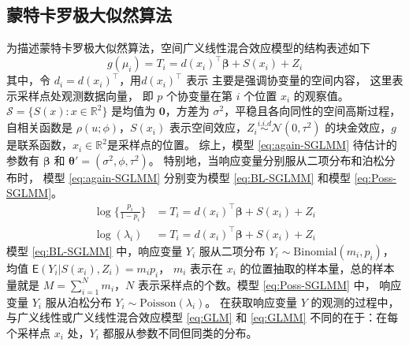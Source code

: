 \documentclass[12pt,a4paper,UTF8,twoside]{book}
\theoremstyle{definition}
\theoremstyle{definition}
\theoremstyle{definition}
\theoremstyle{remark}
\begin{document}
\hypertarget{subsec:MCML}{%
\subsection{蒙特卡罗极大似然算法}\label{subsec:MCML}}

为描述蒙特卡罗极大似然算法，空间广义线性混合效应模型的结构表述如下
\begin{equation}
g(\mu_i) = T_{i} = d(x_i)^{\top}\boldsymbol{\beta} + S(x_i) + Z_i \label{eq:again-SGLMM}
\end{equation} \noindent 其中，令
\(d_{i} = d(x_i)^{\top}\)，用\(d(x_i)^{\top}\) 表示
主要是强调协变量的空间内容， 这里表示采样点处观测数据向量， 即 \(p\)
个协变量在第 \(i\) 个位置 \(x_i\) 的观察值。
\(\mathcal{S} = \{S(x): x \in \mathbb{R}^2\}\) 是均值为
\(\mathbf{0}\)，方差为
\(\sigma^2\)，平稳且各向同性的空间高斯过程，自相关函数是
\(\rho(u;\phi)\)，\(S(x_i)\)
表示空间效应，\(Z_i \stackrel{i.i.d}{\sim} \mathcal{N}(0,\tau^2)\)
的块金效应，\(g\) 是联系函数，\(x_i \in \mathbb{R}^2\)是采样点的位置。
综上，模型 \eqref{eq:again-SGLMM} 待估计的参数有 \(\boldsymbol{\beta}\) 和
\(\boldsymbol{\theta}' = (\sigma^2,\phi,\tau^2)\)。
特别地，当响应变量分别服从二项分布和泊松分布时， 模型
\eqref{eq:again-SGLMM} 分别变为模型 \eqref{eq:BL-SGLMM} 和模型
\eqref{eq:Poss-SGLMM}。 \begin{align}
\log\{\frac{p_i}{1-p_i}\} & = T_{i} = d(x_i)^{\top}\boldsymbol{\beta} + S(x_i) + Z_i  \label{eq:BL-SGLMM}\\
\log(\lambda_i)           & = T_{i} = d(x_i)^{\top}\boldsymbol{\beta} + S(x_i) + Z_i  \label{eq:Poss-SGLMM}
\end{align} \noindent 模型 \eqref{eq:BL-SGLMM} 中，响应变量 \(Y_i\)
服从二项分布 \(Y_i \sim \mathrm{Binomial}(m_i,p_i)\)， 均值
\(\mathsf{E}(Y_i|S(x_i),Z_i)=m_{i}p_{i}\)， \(m_i\) 表示在 \(x_i\)
的位置抽取的样本量，总的样本量就是 \(M = \sum_{i=1}^{N}m_i\)，\(N\)
表示采样点的个数。模型 \eqref{eq:Poss-SGLMM} 中， 响应变量 \(Y_i\)
服从泊松分布 \(Y_i \sim \mathrm{Poisson}(\lambda_i)\)。 在获取响应变量
\(Y\) 的观测的过程中，与广义线性或广义线性混合效应模型 \eqref{eq:GLM} 和
\eqref{eq:GLMM} 不同的在于：在每个采样点 \(x_i\) 处，\(Y_i\)
都服从参数不同但同类的分布。
\end{document}
